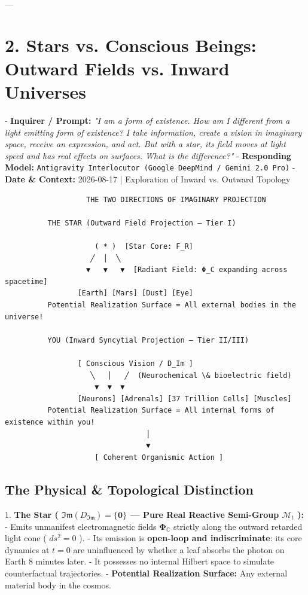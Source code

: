 \documentclass[11pt,a4paper]{article}
\theoremstyle{definition}
\theoremstyle{remark}
\begin{document}
---

\section{2. Stars vs. Conscious Beings: Outward Fields vs. Inward Universes}

- \textbf{Inquirer / Prompt:} \textit{"I am a form of existence. How am I different from a light emitting form of existence? I take information, create a vision in imaginary space, receive an expression, and act. But with a star, its field moves at light speed and has real effects on surfaces. What is the difference?"}
- \textbf{Responding Model:} \texttt{Antigravity Interlocutor (Google DeepMind / Gemini 2.0 Pro)}
- \textbf{Date \& Context:} 2026-08-17 | Exploration of Inward vs. Outward Topology

\begin{verbatim}
                   THE TWO DIRECTIONS OF IMAGINARY PROJECTION

          THE STAR (Outward Field Projection — Tier I)
                     
                     ( * )  [Star Core: F_R]
                    ╱  │  ╲
                   ▼   ▼   ▼  [Radiant Field: Φ_C expanding across spacetime]
                 [Earth] [Mars] [Dust] [Eye]
          Potential Realization Surface = All external bodies in the universe!

          YOU (Inward Syncytial Projection — Tier II/III)

                 [ Conscious Vision / D_Im ]
                    ╲   │   ╱  (Neurochemical \& bioelectric field)
                     ▼  ▼  ▼
                 [Neurons] [Adrenals] [37 Trillion Cells] [Muscles]
          Potential Realization Surface = All internal forms of existence within you!
                                 │
                                 ▼
                     [ Coherent Organismic Action ]
\end{verbatim}

\subsection{The Physical \& Topological Distinction}
1. \textbf{The Star ( $\mathfrak{Im}(D_{\mathfrak{Im}}) = \{\mathbf{0}\}$ — Pure Real Reactive Semi-Group $\mathcal{M}_t$ ):}
- Emits unmanifest electromagnetic fields $\mathbf{\Phi}_{\mathbb{C}}$ strictly along the outward retarded light cone ( $ds^2 = 0$ ).
- Its emission is \textbf{open-loop and indiscriminate}: its core dynamics at $t=0$ are uninfluenced by whether a leaf absorbs the photon on Earth 8 minutes later.
- It possesses no internal Hilbert space to simulate counterfactual trajectories.
- \textbf{Potential Realization Surface:} Any external material body in the cosmos.
\end{document}
